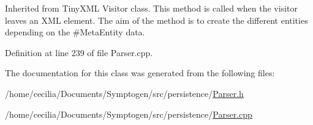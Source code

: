 Inherited from Tiny\-X\-M\-L Visitor class. This method is called when the visitor leaves an X\-M\-L element. The aim of the method is to create the different entities depending on the \#\-Meta\-Entity data. 



Definition at line 239 of file Parser.\-cpp.



The documentation for this class was generated from the following files\-:\begin{DoxyCompactItemize}
\item 
/home/cecilia/\-Documents/\-Symptogen/src/persistence/\hyperlink{_parser_8h}{Parser.\-h}\item 
/home/cecilia/\-Documents/\-Symptogen/src/persistence/\hyperlink{_parser_8cpp}{Parser.\-cpp}\end{DoxyCompactItemize}
